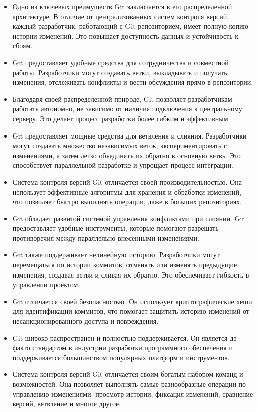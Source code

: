     \begin{itemize}
        \item Одно из ключевых преимуществ Git заключается в его распределенной архитектуре. В отличие от централизованных систем контроля версий, каждый разработчик, работающий с Git-репозиторием, имеет полную копию истории изменений. Это повышает доступность данных и устойчивость к сбоям.
        \item Git предоставляет удобные средства для сотрудничества и совместной работы. Разработчики могут создавать ветки, выкладывать и получать изменения, отслеживать конфликты и вести обсуждения прямо в репозитории.
        \item Благодаря своей распределенной природе, Git позволяет разработчикам работать автономно, не зависимо от наличия подключения к центральному серверу. Это делает процесс разработки более гибким и эффективным.
        \item Git предоставляет мощные средства для ветвления и слияния. Разработчики могут создавать множество независимых веток, экспериментировать с изменениями, а затем легко объединять их обратно в основную ветвь. Это способствует параллельной разработке и упрощает процесс интеграции.
        \item Система контроля версий Git отличается своей производительностью. Она использует эффективные алгоритмы для хранения и обработки изменений, что позволяет быстро выполнять операции, даже в больших репозиториях.
        \item Git обладает развитой системой управления конфликтами при слиянии. Git предоставляет удобные инструменты, которые помогают разрешать противоречия между параллельно внесенными изменениями.
        \item Git также поддерживает нелинейную историю. Разработчики могут перемещаться по истории коммитов, отменять или изменять предыдущие изменения, создавая ветви и сливая их обратно. Это обеспечивает гибкость в управлении проектом.
        \item Git отличается своей безопасностью. Он использует криптографические хеши для идентификации коммитов, что помогает защитить историю изменений от несанкционированного доступа и повреждения.
        \item Git широко распространен и полностью поддерживается. Он является де-факто стандартом в индустрии разработки программного обеспечения и поддерживается большинством популярных платформ и инструментов.
        \item Система контроля версий Git отличается своим богатым набором команд и возможностей. Она позволяет выполнять самые разнообразные операции по управлению изменениями: просмотр истории, фиксация изменений, сравнение версий, ветвление и многое другое.

\end{itemize}
